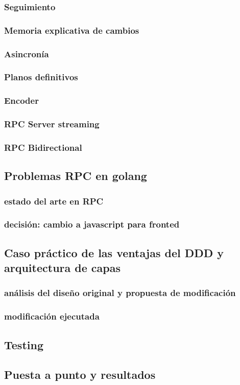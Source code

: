 \subsubsection{Seguimiento}\label{subsec:seguimiento}

\subsubsection{Memoria explicativa de cambios}\label{subsec:memoria explicativa de cambios}

\subsubsection{Asincronía}\label{subsec:asincronia}

\subsubsection{Planos definitivos}\label{subsec:planos definitivos}

\subsubsection{Encoder}
    \subsubsection{RPC Server streaming}
    \subsubsection{RPC Bidirectional}
\subsection{Problemas RPC en golang}\label{subsec:problemas-rpc-en-golang}

\subsubsection{estado del arte en RPC}
    \subsubsection{decisión: cambio a javascript para fronted}
\subsection{Caso práctico de las ventajas del DDD y arquitectura de capas}
    \subsubsection{análisis del diseño original y propuesta de modificación}
    \subsubsection{modificación ejecutada}
\subsection{Testing}
\subsection{Puesta a punto y resultados}